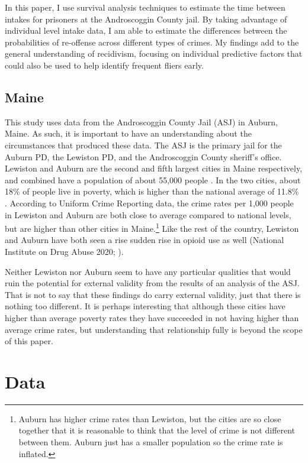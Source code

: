 \documentclass{article}
\begin{document}
In this paper, I use survival analysis techniques to estimate the time between intakes for prisoners at the Androscoggin County jail. By taking advantage of individual level intake data, I am able to estimate the differences between the probabilities of re-offense across different types of crimes. My findings add to the general understanding of recidivism, focusing on individual predictive factors that could also be used to help identify frequent fliers early. 

\subsection{Maine}
This study uses data from the Androscoggin County Jail (ASJ) in Auburn, Maine. As such, it is important to have an understanding about the circumstances that produced these data. The ASJ is the primary jail for the Auburn PD, the Lewiston PD, and the Androscoggin County sheriff's office. Lewiston and Auburn are the second and fifth largest cities in Maine respectively, and combined have a population of about 55,000 people \parencite{maine}. In the two cities, about 18\% of people live in poverty, which is higher than the national average of 11.8\% \parencite{census}. According to Uniform Crime Reporting data, the crime rates per 1,000 people in Lewiston and Auburn are both close to average compared to national levels, but are higher than other cities in Maine\parencite{crime}.\footnote{Auburn has higher crime rates than Lewiston, but the cities are so close together that it is reasonable to think that the level of crime is not different between them. Auburn just has a smaller population so the crime rate is inflated.} Like the rest of the country, Lewiston and Auburn have both seen a rise sudden rise in opioid use as well (National Institute on Drug Abuse 2020; \cite{dave}). 

Neither Lewiston nor Auburn seem to have any particular qualities that would ruin the potential for external validity from the results of an analysis of the ASJ. That is not to say that these findings do carry external validity, just that there is nothing too different. It is perhaps interesting that although these cities have higher than average poverty rates they have succeeded in not having higher than average crime rates, but understanding that relationship fully is beyond the scope of this paper. 

\section{Data}
\end{document}
